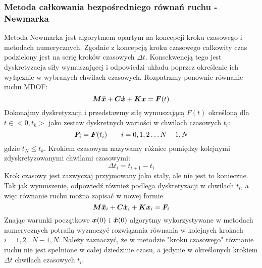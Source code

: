 \subsubsection{Metoda całkowania bezpośredniego równań ruchu - Newmarka}
Metoda Newmarka jest algorytmem opartym na koncepcji kroku czasowego i metodach numerycznych. Zgodnie z koncepcją kroku czasowego całkowity czas podzielony jest na serię kroków czasowych $\Delta t$. Konsekwencją tego jest dyskretyzacja siły wymuszającej i odpowiedzi układu poprzez określenie ich wyłącznie w wybranych chwilach czasowych. Rozpatrzmy ponownie równanie ruchu MDOF:
\begin{equation}
	\bm{M}\bm{\ddot{x}}+\bm{C}\bm{\dot{x}}+\bm{K}\bm{x} = \bm{F}(t)
\end{equation} 
Dokonajmy dyskretyzacji i przedstawmy siłę wymuszającą $F(t)$ określoną dla $t\in<0,t_k>$ jako zestaw dyskretnych wartości w chwilach czasowych $t_i$:
\begin{equation}
	\bm{F}_i=\bm{F}(t_i) \qquad i = 0,1,2\dots N-1,N
\end{equation}
gdzie $t_N\leq t_k$. Krokiem czasowym nazywamy różnice pomiędzy kolejnymi zdyskretyzowanymi chwilami czasowymi:
\begin{equation}
	\Delta t_i = t_{i+1}-t_i
\end{equation}
Krok czasowy jest zazwyczaj przyjmowany jako stały, ale nie jest to konieczne. Tak jak wymuszenie, odpowiedź również podlega dyskretyzacji w chwilach $t_i$, a więc równanie ruchu można zapisać w nowej formie
\begin{equation} \label{eq: motion_time_step}
	\bm{M}\bm{\ddot{x}}_i+\bm{C}\bm{\dot{x}}_i+\bm{K}\bm{x}_i = \bm{F}_i
\end{equation}
Znając warunki początkowe $\bm{x}(0)$ i $\bm{\dot{x}}(0)$ algorytmy wykorzystywane w metodach numerycznych potrafią wyznaczyć rozwiązania równania w kolejnych krokach $i = 1,2\dots N-1,N$. Należy zaznaczyć, że w metodzie "kroku czasowego" równanie ruchu nie jest spełnione w całej dziedzinie czasu, a jedynie w określonych krokiem $\Delta t$ chwilach czasowych $t_i$.

